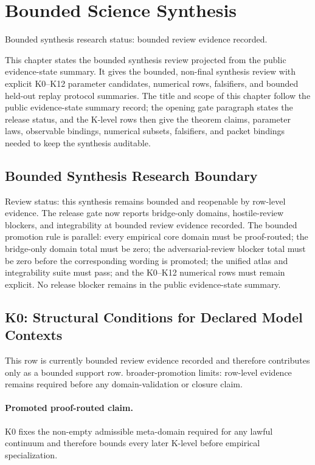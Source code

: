 \section{Bounded Science Synthesis}
\label{sec:oc-core-1-3-unified-synthesis}
Bounded synthesis research status: bounded review evidence recorded.

This chapter states the bounded synthesis review projected from the public evidence-state summary. It gives the bounded, non-final synthesis review with explicit K0--K12 parameter candidates, numerical rows, falsifiers, and bounded held-out replay protocol summaries.
The title and scope of this chapter follow the public evidence-state summary record; the opening gate paragraph states the release status, and the K-level rows then give the theorem claims, parameter laws, observable bindings, numerical subsets, falsifiers, and packet bindings needed to keep the synthesis auditable.

\subsection{Bounded Synthesis Research Boundary}
Review status: this synthesis remains bounded and reopenable by row-level evidence.
The release gate now reports  bridge-only domains,  hostile-review blockers, and integrability at bounded review evidence recorded.
The bounded promotion rule is parallel: every empirical core domain must be proof-routed; the bridge-only domain total must be zero; the adversarial-review blocker total must be zero before the corresponding wording is promoted; the unified atlas and integrability suite must pass; and the K0--K12 numerical rows must remain explicit.
No release blocker remains in the public evidence-state summary.

\subsection{K0: Structural Conditions for Declared Model Contexts}
\label{sec:oc-core-1-3-synthesis-k0}
This row is currently bounded review evidence recorded and therefore contributes only as a bounded support row.
broader-promotion limits: row-level evidence remains required before any domain-validation or closure claim.

\paragraph{Promoted proof-routed claim.}
K0 fixes the non-empty admissible meta-domain required for any lawful continuum and therefore bounds every later K-level before empirical specialization.

